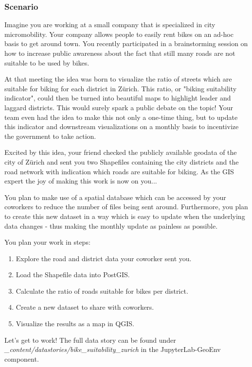 \documentclass[11pt, a4paper, oneside, parskip=full-]{scrartcl}
\begin{document}
\subsubsection*{Scenario}

Imagine you are working at a small company that is specialized in city
micromobility. Your company allows people to easily rent bikes on an ad-hoc
basis to get around town. You recently participated in a brainstorming session
on how to increase public awareness about the fact that still many roads are not
suitable to be used by bikes.

At that meeting the idea was born to visualize the ratio of streets which are
suitable for biking for each district in Zürich. This ratio, or "biking
suitability indicator", could then be turned into beautiful maps to highlight
leader and laggard districts. This would surely spark a public debate on the
topic! Your team even had the idea to make this not only a one-time thing, but
to update this indicator and downstream visualizations on a monthly basis to
incentivize the government to take action.

Excited by this idea, your friend checked the publicly available geodata of the
city of Zürich and sent you two Shapefiles containing the city districts and the
road network with indication which roads are suitable for biking. As the GIS
expert the joy of making this work is now on you...

You plan to make use of a spatial database which can be accessed by your
coworkers to reduce the number of files being sent around. Furthermore, you plan
to create this new dataset in a way which is easy to update when the underlying
data changes - thus making the monthly update as painless as possible.

You plan your work in steps:
\begin{enumerate}
  \item Explore the road and district data your coworker sent you.
  \item Load the Shapefile data into PostGIS.
  \item Calculate the ratio of roads suitable for bikes per district.
  \item Create a new dataset to share with coworkers.
  \item Visualize the results as a map in QGIS.
\end{enumerate}

Let's get to work! The full data story can be found under
\emph{\_content/datastories/bike\_suitability\_zurich} in the JupyterLab-GeoEnv
component.
\end{document}
